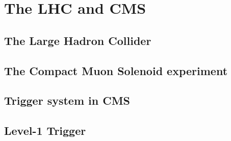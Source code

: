 \chapter{The LHC and CMS}

\section{The Large Hadron Collider}

\section{The Compact Muon Solenoid experiment}

\section{Trigger system in CMS}

\section{Level-1 Trigger}